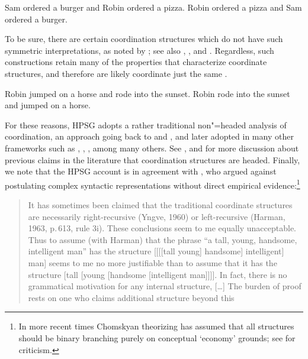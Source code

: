 \documentclass[output=paper
                ,modfonts
                ,nonflat
	        ,collection
	        ,collectionchapter
	        ,collectiontoclongg
 	        ,biblatex
                ,babelshorthands
                ,newtxmath
                ,draftmode
                ,colorlinks, citecolor=brown
]{./langsci/langscibook}
\begin{document}
\begin{exe}
\ex
\begin{xlista}
\ex Sam ordered a burger and Robin ordered a pizza.
\ex Robin ordered a pizza and Sam ordered a burger.
\end{xlista}\label{c1}
\end{exe}

\noindent
To be sure, there are certain coordination structures which do not have such symmetric 
interpretations, as noted by \citet{Ross67a}; see also
\citet{goldsmith}, \citet{lakoff86}, and \citet{levinprince86}.
Regardless, such constructions retain many of the properties that characterize coordinate structures, and therefore are likely 
coordinate just the same \citep[Ch.5]{kehler}.

\begin{exe}
\ex
\begin{xlista}
\ex Robin jumped on a horse and rode into the sunset.
\ex Robin rode into the sunset and jumped on a horse.
\end{xlista}
\end{exe}

For these reasons, HPSG adopts a rather traditional non"=headed analysis of coordination, an approach  going back
to \citet[195]{Bloomfield33a-u} and  \citet{Ross67a}, and later adopted in many other frameworks such as \citet{pesetsky}, \citet{gazdarc},  \citet[1275]{rodney}, among many others. 
See \citet{borsley94}, \citet{Borsley:05} and 
\citet[Ch.2]{chavesthesis} for more discussion about previous claims in the literature that coordination structures are headed.
Finally, we note that the HPSG account is in agreement with \citet[196]{Chomsky65a}, who argued against postulating complex syntactic representations without direct empirical evidence:\footnote{In more recent times Chomskyan theorizing has assumed that all structures should be binary branching purely on conceptual `economy' grounds; see \citet{JL99a-u} for criticism.}

\begin{quote}
It has sometimes been claimed that the traditional coordinate structures are necessarily right-recursive (Yngve, 1960) or left-recursive (Harman, 1963, p.\,613, rule 3i). These conclusions seem to me equally unacceptable. Thus to assume (with Harman) that the phrase “a tall, young, handsome, intelligent man” has the structure [[[[tall young] handsome] intelligent] man] seems to me no more justifiable than to assume that it has
the structure [tall [young [handsome [intelligent man]]]]. In fact, there is no grammatical
motivation for any internal structure, [\ldots] The burden of proof rests on one who claims additional
structure beyond this \citep[196,197]{Chomsky65a}
\end{quote}
\end{document}
